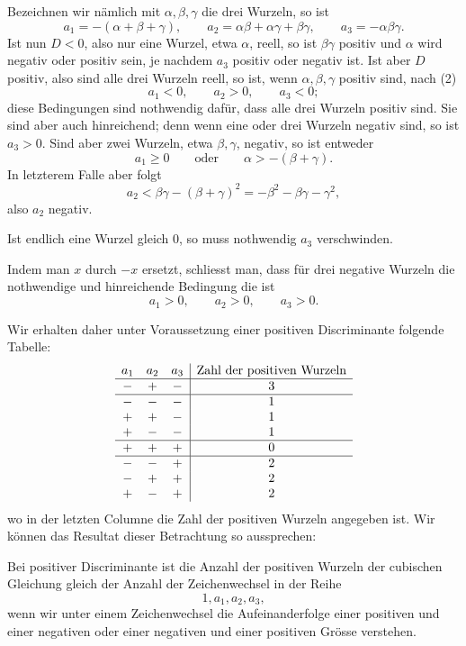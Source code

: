 \documentclass[11pt]{article}
\begin{document}
Bezeichnen wir n\"amlich mit $\alpha,\beta,\gamma$ die drei Wurzeln, so ist
\begin{equation}
        a_1=-(\alpha+\beta+\gamma),\qquad
        a_2=\alpha\beta+\alpha\gamma+\beta\gamma,\qquad
        a_3=-\alpha\beta\gamma.
\tag{2}
\end{equation}
Ist nun $D<0$, also nur eine Wurzel, etwa $\alpha$, reell, so ist $\beta\gamma$ positiv und $\alpha$ wird negativ oder positiv sein, je nachdem $a_3$ positiv oder negativ ist. Ist aber $D$ positiv, also sind alle drei Wurzeln reell, so ist, wenn $\alpha,\beta,\gamma$ positiv sind, nach (2)
\begin{equation}
        a_1<0,
        \qquad a_2>0,
        \qquad a_3<0;
\tag{3}
\end{equation}
diese Bedingungen sind nothwendig daf\"ur, dass alle drei Wurzeln positiv sind. Sie sind aber auch hinreichend; denn wenn eine oder drei Wurzeln negativ sind, so ist $a_3>0$. Sind aber zwei Wurzeln, etwa $\beta,\gamma$, negativ, so ist entweder
\[
        a_1\geq 0 \qquad\text{oder}\qquad \alpha>-(\beta+\gamma).
\]
In letzterem Falle aber folgt
\[
        a_2<\beta\gamma-(\beta+\gamma)^2=-\beta^2-\beta\gamma-\gamma^2,
\]
also $a_2$ negativ.

Ist endlich eine Wurzel gleich $0$, so muss nothwendig $a_3$ verschwinden.

Indem man $x$ durch $-x$ ersetzt, schliesst man, dass f\"ur drei negative Wurzeln die nothwendige und hinreichende Bedingung die ist
\begin{equation}
        a_1>0,
        \qquad a_2>0,
        \qquad a_3>0.
\tag{4}
\end{equation}

Wir erhalten daher unter Voraussetzung einer positiven Discriminante folgende Tabelle:
\[
\begin{array}{ccc|c}
 a_1 & a_2 & a_3 & \text{Zahl der positiven Wurzeln}\cr\hline
 - & + & - & 3\cr\hline
 - & - & - & 1\cr
 + & + & - & 1\cr
 + & - & - & 1\cr\hline
 + & + & + & 0\cr\hline
 - & - & + & 2\cr
 - & + & + & 2\cr
 + & - & + & 2
\end{array}
\]
wo in der letzten Columne die Zahl der positiven Wurzeln angegeben ist. Wir k\"onnen das Resultat dieser Betrachtung so aussprechen:

Bei positiver Discriminante ist die Anzahl der positiven Wurzeln der cubischen Gleichung gleich der Anzahl der Zeichenwechsel in der Reihe
\[
        1,a_1,a_2,a_3,
\]
wenn wir unter einem Zeichenwechsel die Aufeinanderfolge einer positiven und einer negativen oder einer negativen und einer positiven Gr\"osse verstehen.
\end{document}
